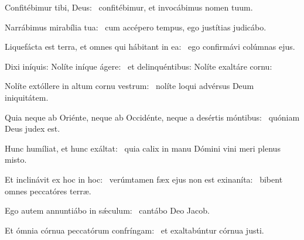 \item Confitébimur tibi, Deus:~\psstar{} confitébimur, et invocábimus nomen tuum.

\item Narrábimus mirabília tua:~\psstar{} cum accépero tempus, ego justítias judicábo.

\item Liquefácta est terra, et omnes qui hábitant in ea:~\psstar{} ego confirmávi colúmnas ejus.

\item Dixi iníquis: Nolíte iníque ágere:~\psstar{} et delinquéntibus: Nolíte exaltáre cornu:

\item Nolíte extóllere in altum cornu vestrum:~\psstar{} nolíte loqui advérsus Deum iniquitátem.

\item Quia neque ab Oriénte, neque ab Occidénte, neque a desértis móntibus:~\psstar{} quóniam Deus judex est.

\item Hunc humíliat, et hunc exáltat:~\psstar{} quia calix in manu Dómini vini meri plenus misto.

\item Et inclinávit ex hoc in hoc:~\pscross{} verúmtamen fæx ejus non est exinaníta:~\psstar{} bibent omnes peccatóres terræ.

\item Ego autem annuntiábo in sǽculum:~\psstar{} cantábo Deo Jacob.

\item Et ómnia córnua peccatórum confríngam:~\psstar{} et exaltabúntur córnua justi.

